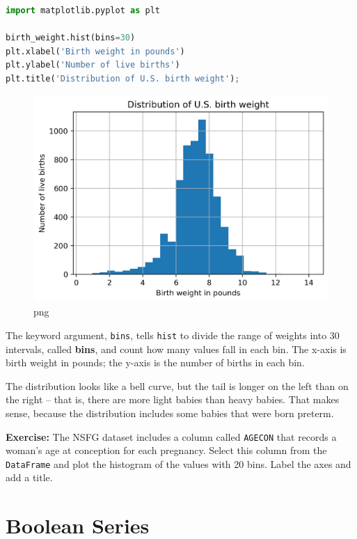 \documentclass[
]{book}
\newcommand{\passthrough}[1]{#1}
\begin{document}
\begin{lstlisting}[language=Python]
import matplotlib.pyplot as plt

birth_weight.hist(bins=30)
plt.xlabel('Birth weight in pounds')
plt.ylabel('Number of live births')
plt.title('Distribution of U.S. birth weight');
\end{lstlisting}

\begin{figure}
\centering
\includegraphics{07_dataframes_files/07_dataframes_60_0.png}
\caption{png}
\end{figure}

The keyword argument, \passthrough{\lstinline!bins!}, tells
\passthrough{\lstinline!hist!} to divide the range of weights into 30
intervals, called \textbf{bins}, and count how many values fall in each
bin. The x-axis is birth weight in pounds; the y-axis is the number of
births in each bin.

The distribution looks like a bell curve, but the tail is longer on the
left than on the right -- that is, there are more light babies than
heavy babies. That makes sense, because the distribution includes some
babies that were born preterm.

\textbf{Exercise:} The NSFG dataset includes a column called
\passthrough{\lstinline!AGECON!} that records a woman's age at
conception for each pregnancy. Select this column from the
\passthrough{\lstinline!DataFrame!} and plot the histogram of the values
with 20 bins. Label the axes and add a title.

\section{Boolean Series}\label{boolean-series}
\end{document}

